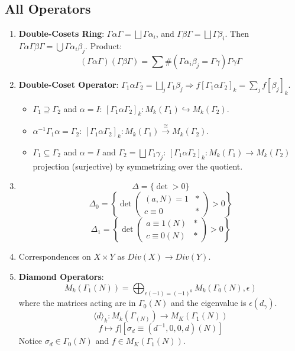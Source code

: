 \documentclass{article}
\newcommand{\ra}{\rightarrow}
\newcommand{\Ra}{\Rightarrow}
\newcommand{\raa}[1]{\overset{#1}{\longrightarrow}}
\newcommand{\hra}{\hookrightarrow}
\begin{document}
\subsection{All Operators}
\begin{multicols}{2}
\begin{enumerate}
\item \textbf{Double-Cosets Ring}: $\Gamma \alpha \Gamma = \bigsqcup \Gamma \alpha_i$, and $\Gamma \beta \Gamma = \bigsqcup \Gamma \beta_i$. Then $\Gamma \alpha \Gamma \beta \Gamma = \bigcup \Gamma \alpha_i \beta_j$. Product:
\[(\Gamma \alpha \Gamma)(\Gamma \beta \Gamma) = \sum \#(\Gamma\alpha_i\beta_j = \Gamma \gamma) \Gamma \gamma \Gamma\]

\item \textbf{Double-Coset Operator}: $\Gamma_1\alpha\Gamma_2 = \bigsqcup_j \Gamma_1\beta_j \Ra f[\Gamma_1\alpha\Gamma_2]_k = \sum_j f[\beta_j]_k$.
\begin{itemize}
\item $\Gamma_1 \supseteq \Gamma_2$ and $\alpha = I$: $[\Gamma_1\alpha\Gamma_2]_k: M_k(\Gamma_1) \hra M_k(\Gamma_2)$.
\item $\alpha^{-1}\Gamma_1\alpha = \Gamma_2$: $[\Gamma_1\alpha\Gamma_2]_k: M_k(\Gamma_1) \raa{\cong} M_k(\Gamma_2)$.
\item $\Gamma_1 \subseteq \Gamma_2$ and $\alpha = I$ and $\Gamma_2 = \bigsqcup \Gamma_1 \gamma_j$: $[\Gamma_1\alpha\Gamma_2]_k: M_k(\Gamma_1) \ra M_k(\Gamma_2)$ projection (surjective) by symmetrizing over the quotient. 
\end{itemize}

\item 
\[\Delta = \{\det > 0\}\]
\[\Delta_0 = \left\{\det\left(\begin{array}{cc} (a,N) = 1 & * \\ c \equiv 0 & * \end{array}\right) > 0\right\}\] 
\[\Delta_1 = \left\{\det\left(\begin{array}{cc} a\equiv 1 (N)& * \\ c \equiv 0(N) & * \end{array}\right) > 0\right\}\] 

\item Correspondences on  $X \times Y$ as $Div(X) \ra Div(Y)$. 

\item \textbf{Diamond Operators}: 
\[M_k(\Gamma_1(N)) = \bigoplus_{\epsilon(-1) = (-1)^k} M_k(\Gamma_0(N),\epsilon)\] 
where the matrices acting are in $\Gamma_0(N)$ and the eigenvalue is $\epsilon(d_\gamma)$. 
\[\langle d\rangle_k: M_k(\Gamma_(N)) \ra M_K(\Gamma_1(N))\]
\[f \mapsto f|\left[\sigma_d \equiv (d^{-1},0,0,d)(N)\right] \]
Notice $\sigma_d \in \Gamma_0(N)$ and $f \in M_K(\Gamma_1(N))$. 





\end{enumerate}
\end{multicols}
\end{document}
